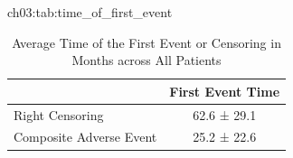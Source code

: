 \begin{table}[hbtp]
    \setlength{\tabcolsep}{4pt}
    \footnotesize
    \ChThreeFloatContents
      {ch03:tab:time_of_first_event}
      {\caption{Average Time of the First Event or Censoring in Months across All Patients}}
      {\begin{tabular}{l c}
    \toprule
    & First Event Time \\
    \midrule
    Right Censoring & 62.6 ± 29.1 \\
    Composite Adverse Event &  25.2 ± 22.6  \\
    \bottomrule
    \end{tabular}}
\end{table}